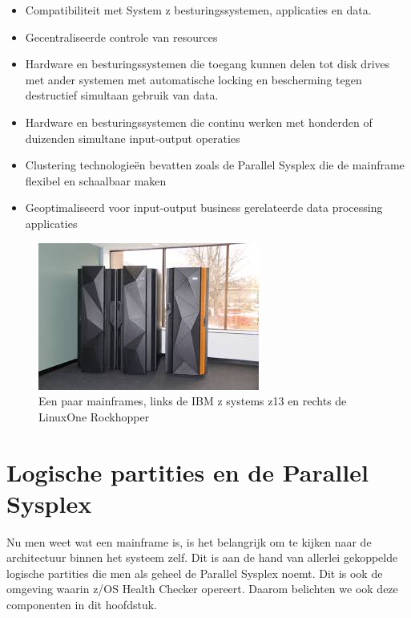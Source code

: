 \begin{itemize}
	\item Compatibiliteit met System z besturingssystemen, applicaties en data.
	\item Gecentraliseerde controle van resources
	\item Hardware en besturingssystemen die toegang kunnen delen tot disk drives met ander systemen met automatische locking en bescherming tegen destructief simultaan gebruik van data.
	\item Hardware en besturingssystemen die continu werken met honderden of duizenden simultane input-output operaties
	\item Clustering technologieën bevatten zoals de Parallel Sysplex die de mainframe flexibel en schaalbaar maken
	\item Geoptimaliseerd voor input-output business gerelateerde data processing applicaties
\end{itemize}

\begin{figure}[h]
	\centering
	\includegraphics{img/mainframe}
	\caption[Mainframe z13 en LinuxOne Rockhopper]{Een paar mainframes, links de IBM z systems z13 en rechts de LinuxOne Rockhopper}
	\label{fig:mainframe}
\end{figure}



\section{Logische partities en de Parallel Sysplex}
\label{sec:Logische partities en de Parallel Sysplex}

Nu men weet wat een mainframe is, is het belangrijk om te kijken naar de architectuur binnen het systeem zelf. Dit is aan de hand van allerlei gekoppelde logische partities die men als geheel de Parallel Sysplex noemt. Dit is ook de omgeving waarin z/OS Health Checker opereert. Daarom belichten we ook deze componenten in dit hoofdstuk.

